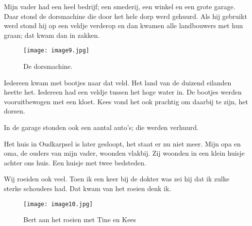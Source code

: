 Mijn vader had een heel bedrijf; een smederij, een winkel en een grote garage. Daar stond de
dorsmachine die door het hele dorp werd gehuurd. Als hij gebruikt werd stond hij op een veldje
verderop en dan kwamen alle landbouwers met hun graan; dat kwam dan in zakken. 

\begin{figure}[h] \texttt{[image: image9.jpg]} \caption{De dorsmachine.}
\end{figure}

Iedereen kwam met bootjes naar dat veld. Het land van de duizend eilanden heette het. Iedereen had
een veldje tussen het hoge water in. De bootjes werden vooruitbewogen met een kloet. Kees vond het
ook prachtig om daarbij te zijn, het dorsen.

In de garage stonden ook een aantal auto’s; die werden verhuurd.

Het huis in Oudkarpsel is later gesloopt, het staat er nu niet meer. Mijn opa en oma, de ouders van
mijn vader, woonden vlakbij. Zij woonden in een klein huisje achter ons huis. Een huisje met twee
bedsteden.

Wij roeiden ook veel. Toen ik een keer bij de dokter was zei hij dat ik zulke sterke schouders had.
Dat kwam van het roeien denk ik.

\begin{figure}[h] \texttt{[image: image10.jpg]} \caption{Bert aan het roeien met
Tine en Kees} \end{figure}

